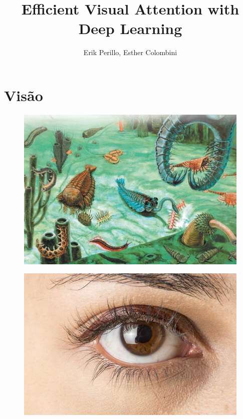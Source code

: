 \documentclass[10pt]{beamer}
\title{Efficient Visual Attention with Deep Learning}
\subtitle{}
\author{Erik Perillo, Esther Colombini}
\date{}
\institute{Instituto de Computação -- Unicamp}
\begin{document}
\maketitle

\section{Visão}

\begin{frame}{}
    \begin{figure}
        \centering
        \includegraphics[width=1.0\linewidth]{./img/precambrian}
    \end{figure}
\end{frame}

\begin{frame}{}
    \begin{figure}
        \centering
        \includegraphics[width=1.0\linewidth]{./img/eye.jpg}
    \end{figure}
\end{frame}
\end{document}
